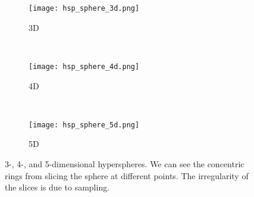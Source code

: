 \begin{figure} 
  \centering
  \begin{subfigure}[b]{0.3\linewidth}
    \texttt{[image: hsp\_sphere\_3d.png]}
    \caption{3D}
    \label{fig:spheres:3d} 
  \end{subfigure} 
  ~
  \begin{subfigure}[b]{0.3\linewidth}
    \texttt{[image: hsp\_sphere\_4d.png]}
    \caption{4D}
    \label{fig:spheres:4d} 
  \end{subfigure}
  ~
  \begin{subfigure}[b]{0.3\linewidth}
    \texttt{[image: hsp\_sphere\_5d.png]}
    \caption{5D}
    \label{fig:spheres:5d} 
  \end{subfigure}
  \caption[3-, 4-, and 5-dimensional hyperspheres.]{%
    3-, 4-, and 5-dimensional hyperspheres. We can see the concentric rings
    from slicing the sphere at different points. The irregularity of the
    slices is due to sampling.
  } 
  \label{fig:spheres} 
\end{figure}


